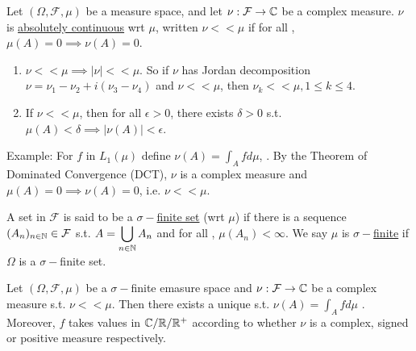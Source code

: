 \documentclass{article}
\begin{document}
\begin{boxdef}\label{def: absolute continuity}
     Let $(\Omega, \mathcal{F}, \mu)$ be a measure space, and let $\nu:\mathcal{F}\to\mathbb{C}$ be a complex measure. $\nu$ is \noindent\underline{absolutely continuous} wrt $\mu$, written $\nu<<\mu$ if for all ,\\
    $\mu(A)=0\implies \nu(A)=0$.
\end{boxdef}

\begin{remark}
    \begin{enumerate}
        \item $\nu<<\mu\implies |\nu|<<\mu$. So if $\nu$ has Jordan decomposition $\nu = \nu_1-\nu_2+i(\nu_3-\nu_4)$ and $\nu<<\mu$, then $\nu_k<<\mu, 1\leq k\leq 4$.
        \item If $\nu<<\mu$, then for all $\epsilon>0$, there exists $\delta>0$ s.t.  $\mu(A)<\delta\implies |\nu(A)|<\epsilon$.
    \end{enumerate}
\end{remark}

\begin{examplesblock}{Example:}\label{examples: 5} For $f$  in $L_1(\mu)$ define $\nu(A)=\displaystyle \int_A f d\mu$, . By the Theorem of Dominated Convergence (DCT), $\nu$ is a complex measure and $\mu(A)=0\implies \nu(A)=0$, i.e. $\nu<<\mu$.
\end{examplesblock}

\begin{boxdef}\label{def: $\sigma-$ finite set}
    A set in $\mathcal{F}$ is said to be a \noindent\underline{$\sigma-$finite set} (wrt $\mu$) if there is a sequence $(A_n)_{n\in\mathbb{N}}\in\mathcal{F}$ s.t. $A=\displaystyle\bigcup_{n\in\mathbb{N}}A_n$ and for all , $\mu(A_n)<\infty$. We say $\mu$ is \noindent\underline{$\sigma-$finite} if $\Omega$ is a $\sigma-$finite set.
\end{boxdef}

\begin{theorem}\label{thm: Radon-Nikodym}
    Let $(\Omega, \mathcal{F}, \mu)$ be a $\sigma-$finite emasure space and $\nu:\mathcal{F}\to\mathbb{C}$ be a complex measure s.t. $\nu<<\mu$. Then there exists a unique  s.t. $\nu(A)=\displaystyle \int_A f d\mu$ . Moreover, $f$ takes values in $\mathbb{C}/\mathbb{R}/\mathbb{R}^+$ according to whether $\nu$ is a complex, signed or positive measure respectively.
\end{theorem}
\end{document}
